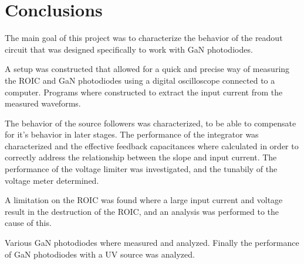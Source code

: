 \section{Conclusions}\label{sec:conclusions_and_future_work}
The main goal of this project was to characterize the behavior of the readout circuit that was designed specifically to work with GaN photodiodes.

A setup was constructed that allowed for a quick and precise way of measuring the ROIC and GaN photodiodes using a digital oscilloscope connected to a computer. Programs where constructed to extract the input current from the measured waveforms.

The behavior of the source followers was characterized, to be able to compensate for it's behavior in later stages. The performance of the integrator was characterized and the effective feedback capacitances where calculated in order to correctly address the relationship between the slope and input current. The performance of the voltage limiter was investigated, and the tunabily of the voltage meter determined. 

A limitation on the ROIC was found where a large input current and voltage result in the destruction of the ROIC, and an analysis was performed to the cause of this.

Various GaN photodiodes where measured and analyzed. Finally the performance of GaN photodiodes with a UV source was analyzed.




